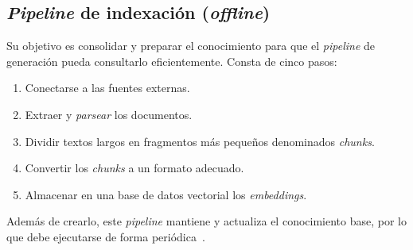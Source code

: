 \subsection{\textit{Pipeline} de indexación (\textit{offline})}
Su objetivo es consolidar y preparar el conocimiento para que el \textit{pipeline} de generación pueda consultarlo eficientemente. Consta de cinco pasos:
\begin{enumerate}
\tightlist
	\item Conectarse a las fuentes externas.
	\item Extraer y \textit{parsear} los documentos.
	\item Dividir textos largos en fragmentos más pequeños denominados \textit{chunks}.
	\item Convertir los \textit{chunks} a un formato adecuado.
	\item Almacenar en una base de datos vectorial los \textit{embeddings}.
\end{enumerate}
Además de crearlo, este \textit{pipeline} mantiene y actualiza el conocimiento base, por lo que debe ejecutarse de forma periódica~\cite{book:RAG_SimpleGuide}.

